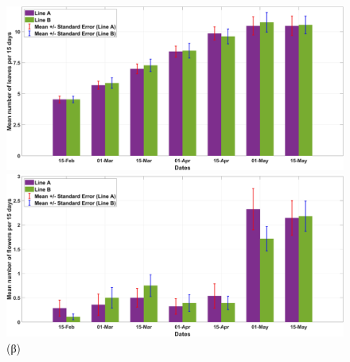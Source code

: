 \documentclass[12pt, a4paper]{report} %
\begin{document}
\begin{figure}[H]
    \centering
    \begin{adjustwidth}{-0.5cm}{0cm}
        \begin{minipage}{0.5\textwidth}
            \centering
            \includegraphics[scale=0.05]{leaves_flowers_a.jpg}
            \caption*{\hspace{35pt}(α)}{}
        \end{minipage}
        \hfill
        \begin{minipage}[c]{0.5\textwidth}
            \centering
            \includegraphics[scale=0.05]{leaves_flowers_b.jpg}
            \caption*{\hspace{35pt}(β)}{}
        \end{minipage}

        \medskip


\end{adjustwidth}
\end{figure}
\end{document}
